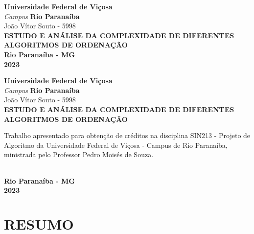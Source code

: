 \documentclass[12pt,arial]{article}
\author{[João Vítor Souto de Lima]}
\begin{document}
	\begin{titlepage}
		\begin{center}
			\textbf{Universidade Federal de Viçosa}
			\textit{\\Campus}
			\textbf{Rio Paranaíba}
			\textnormal{\\\vspace{4cm}João Vítor Souto - 5998}
			\textbf{\\\vspace{5cm}ESTUDO E ANÁLISE DA COMPLEXIDADE DE DIFERENTES ALGORITMOS DE ORDENAÇÃO}
			\textbf{\\\vspace{5cm}Rio Paranaíba - MG \\ 2023}
		\end{center}
	\end{titlepage}
	
		\begin{titlepage}
			\begin{center}
				\textbf{Universidade Federal de Viçosa}
				\textit{\\Campus}
				\textbf{Rio Paranaíba}
				\textnormal{\\\vspace{3cm}João Vítor Souto - 5998}
				\textbf{\\\vspace{4cm}ESTUDO E ANÁLISE DA COMPLEXIDADE DE DIFERENTES ALGORITMOS DE ORDENAÇÃO\vspace{3cm}}
					\begin{flushright}
						\begin{minipage}{.5\textwidth}
							\textnormal{Trabalho apresentado para obtenção de créditos na disciplina SIN213 - Projeto de Algoritmo da Universidade Federal de Viçosa - Campus de Rio Paranaíba, ministrada pelo Professor Pedro Moisés de Souza.}
						\end{minipage}
					\end{flushright}
					
				\textbf{\\\vspace{3cm}Rio Paranaíba - MG \\ 2023}
				
			\end{center}
		\end{titlepage}
		
		
		\section{RESUMO}
		
		\newpage
\end{document}
